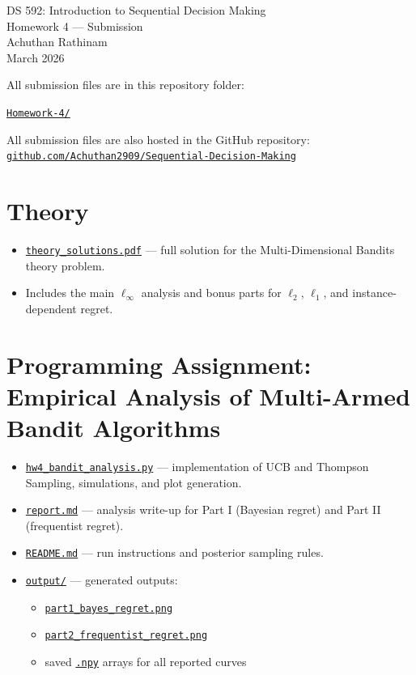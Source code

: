 \documentclass[11pt]{article}
\newcommand{\repo}{https://github.com/Achuthan2909/Sequential-Decision-Making}
\begin{document}
\begin{center}
{\Large DS 592: Introduction to Sequential Decision Making}\\[4pt]
{\Large Homework 4 --- Submission}\\[6pt]
Achuthan Rathinam\\
March 2026
\end{center}

\vspace{0.8em}

All submission files are in this repository folder:
\begin{center}
\href{\repo/tree/main/Homework-4}{\texttt{Homework-4/}}
\end{center}

All submission files are also hosted in the GitHub repository: \\
\href{\repo}{\texttt{github.com/Achuthan2909/Sequential-Decision-Making}}

\section*{Theory}
\begin{itemize}
  \item \href{\repo/blob/main/Homework-4/theory_solutions.pdf}{\texttt{theory\_solutions.pdf}} --- full solution for the Multi-Dimensional Bandits theory problem.
  \item Includes the main $\ell_\infty$ analysis and bonus parts for $\ell_2$, $\ell_1$, and instance-dependent regret.
\end{itemize}

\section*{Programming Assignment: Empirical Analysis of Multi-Armed Bandit Algorithms}
\begin{itemize}
  \item \href{\repo/blob/main/Homework-4/hw4_bandit_analysis.py}{\texttt{hw4\_bandit\_analysis.py}} --- implementation of UCB and Thompson Sampling, simulations, and plot generation.
  \item \href{\repo/blob/main/Homework-4/report.md}{\texttt{report.md}} --- analysis write-up for Part I (Bayesian regret) and Part II (frequentist regret).
  \item \href{\repo/blob/main/Homework-4/README.md}{\texttt{README.md}} --- run instructions and posterior sampling rules.
  \item \href{\repo/tree/main/Homework-4/output}{\texttt{output/}} --- generated outputs:
  \begin{itemize}
    \item \href{\repo/blob/main/Homework-4/output/part1_bayes_regret.png}{\texttt{part1\_bayes\_regret.png}}
    \item \href{\repo/blob/main/Homework-4/output/part2_frequentist_regret.png}{\texttt{part2\_frequentist\_regret.png}}
    \item saved \href{\repo/tree/main/Homework-4/output}{\texttt{.npy}} arrays for all reported curves
  \end{itemize}
\end{itemize}
\end{document}

